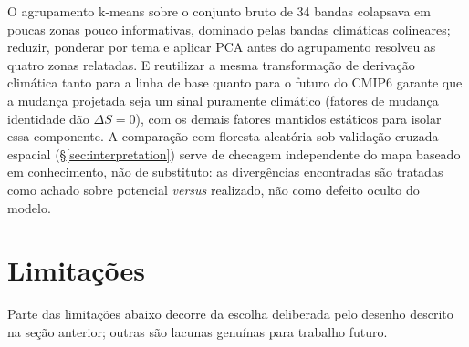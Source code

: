 O agrupamento k-means sobre o conjunto bruto de 34 bandas colapsava em poucas zonas pouco
informativas, dominado pelas bandas climáticas colineares; reduzir, ponderar por tema e aplicar
PCA antes do agrupamento \citep{ding_k-means_2004} resolveu as quatro zonas relatadas. E reutilizar a mesma
transformação de derivação climática tanto para a linha de base quanto para o futuro do CMIP6
garante que a mudança projetada seja um sinal puramente climático (fatores de mudança identidade
dão $\Delta S=0$), com os demais fatores mantidos estáticos para isolar essa componente. A
comparação com floresta aleatória sob validação cruzada espacial (\S\ref{sec:interpretation})
serve de checagem independente do mapa baseado em conhecimento, não de substituto: as
divergências encontradas são tratadas como achado sobre potencial \emph{versus} realizado, não
como defeito oculto do modelo.

\section{Limitações}\label{sec:limitations}

Parte das limitações abaixo decorre da escolha deliberada pelo desenho descrito na seção anterior; 
outras são lacunas genuínas para trabalho futuro.

